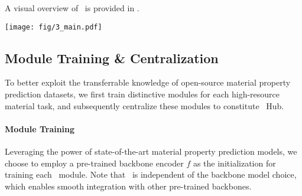 A visual overview of \name \ is provided in .


\begin{figure*}[h]
  \centering
  \texttt{[image: fig/3\_main.pdf]}
  \caption{The \name \ framework.
  (a) During the Module Training \& Centralization stage (\cref{sec:DMT}), \name \ trains full and adapter modules for a wide spectrum of material tasks, constituting the \name \ Hub;
  (b) The Adaptive Module Composition (AMC) \& Fine-tuning stage (\cref{sec:AMC}) leverages the modules in \name \ Hub to compose a tailored module for each downstream task. The AMC algorithm comprises three steps: 1. module prediction estimation (with $k$NN); 2. module weight optimization; 3. module composition. The composed module is further fine-tuned on the task for better adaptation.}
  \label{fig:main}
\end{figure*}

\subsection{Module Training \& Centralization}
\label{sec:DMT}
To better exploit the transferrable knowledge of open-source material property prediction datasets, we first train distinctive modules for each high-resource material task, and subsequently centralize these modules to constitute \name \ Hub.

\paragraph{Module Training}
Leveraging the power of state-of-the-art material property prediction models, we choose to employ a pre-trained backbone encoder $f$ as the initialization for training each \name \ module.
Note that \name \ is independent of the backbone model choice, which enables smooth integration with other pre-trained backbones.

